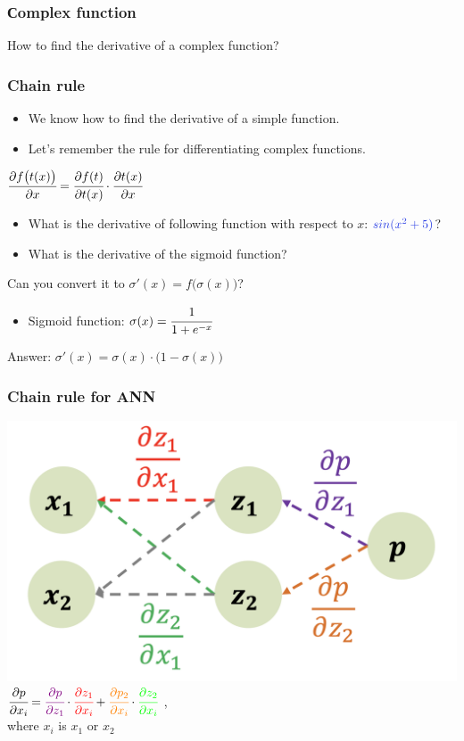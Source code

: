 \documentclass[12pt, aspectratio = 169]{beamer}
\newcommand{\blue}{\color{calmBlue}}
\newcommand{\black}{\color{black}}
\begin{document}

\begin{frame}
    \frametitle{Сomplex function}
	\centering
	How to find the derivative of a complex function?
\end{frame}


\begin{frame}
    \frametitle{Chain rule}
	\centering
	\begin{itemize}
    	\centering
	    \item We know how to find the derivative of a simple function.
	    \item Let's remember the rule for differentiating complex functions.
	\end{itemize}
	$\cfrac{\partial f \big(t(x) \big) }{\partial x} = \cfrac{\partial f(t)}{\partial t(x)} \cdot \cfrac{\partial t(x)}{\partial x}$
	\begin{itemize}
	    \centering
    	\item What is the derivative of following function with respect to $x$: $\blue sin(x^2 + 5) \black$?
    	\item What is the derivative of the sigmoid function?
	\end{itemize}
    Can you convert it to $\sigma'(x) = f \big( \sigma(x) \big)$?\\
	\begin{itemize}
	    \centering
	    \item Sigmoid function: $\sigma(x) = \cfrac{1}{1+e^{-x}}$
	\end{itemize}
	\hfill \break
	 \color{red} Answer: \color{black} $\sigma'(x) = \sigma(x) \cdot \big( 1 - \sigma(x) \big)$
\end{frame}


\begin{frame}
	\frametitle{Chain rule for ANN}
	\centering
	\includegraphics[width=0.5\linewidth]{chain_rule_ann.png}\\
    $\cfrac{\partial p}{\partial x_i} = {\color{violet}\cfrac{\partial p}{\partial z_1}} \cdot {\color{red}\cfrac{\partial z_1}{\partial x_i}} + {\color{orange}\cfrac{\partial p_2}{\partial x_i}} \cdot {\color{green}\cfrac{\partial z_2}{\partial x_i}}$
    \vspace{0.3em},\\
    where $x_{i}$ is $x_{1}$ or $x_{2}$
\end{frame}
\end{document}
